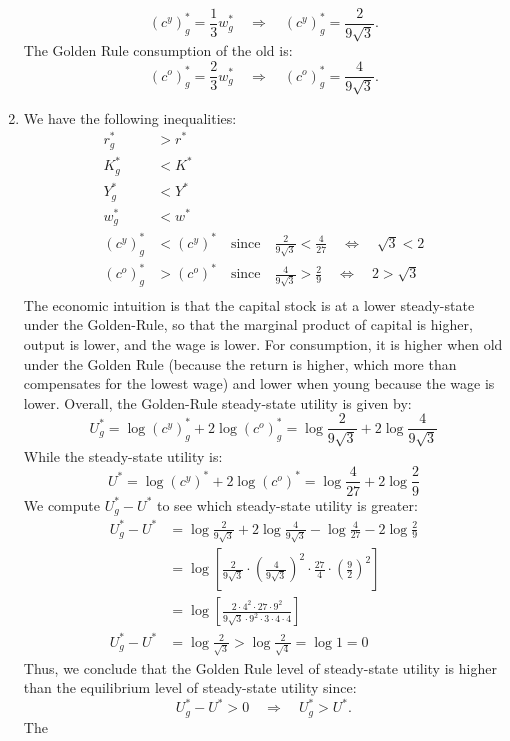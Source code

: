 \documentclass[]{book}
\begin{document}
\begin{enumerate}
  \[(c^y)^{*}_g = \frac{1}{3}w^{*}_g \quad \Rightarrow \quad \boxed{(c^y)^{*}_g = \frac{2}{9\sqrt{3}}}.\]
  The Golden Rule consumption of the old is:
  \[(c^o)^{*}_g = \frac{2}{3}w^{*}_g \quad \Rightarrow \quad \boxed{(c^o)^{*}_g = \frac{4}{9\sqrt{3}}}.\]
\item
  We have the following inequalities: \[
  \begin{aligned}
  r^{*}_g &> r^{*}\\
  K^{*}_g &< K^{*}\\
  Y^{*}_g &< Y^{*}\\
  w^{*}_g &< w^{*}\\
  (c^y)^{*}_g &< (c^y)^{*} \quad \text{since} \quad \frac{2}{9\sqrt{3}}<\frac{4}{27} \quad \Leftrightarrow \quad \sqrt{3} <2 \\
  (c^o)^{*}_g &> (c^o)^{*} \quad \text{since} \quad \frac{4}{9\sqrt{3}}>\frac{2}{9} \quad \Leftrightarrow \quad 2 >\sqrt{3} \\
  \end{aligned}
  \] The economic intuition is that the capital stock is at a lower
  steady-state under the Golden-Rule, so that the marginal product of
  capital is higher, output is lower, and the wage is lower. For
  consumption, it is higher when old under the Golden Rule (because the
  return is higher, which more than compensates for the lowest wage) and
  lower when young because the wage is lower. Overall, the Golden-Rule
  steady-state utility is given by:
  \[U^*_g = \log(c^y)^{*}_g+2\log(c^o)^{*}_g = \log\frac{2}{9\sqrt{3}}+2\log \frac{4}{9\sqrt{3}}\]
  While the steady-state utility is:
  \[U^* = \log(c^y)^{*}+2\log(c^o)^{*} = \log\frac{4}{27}+2\log \frac{2}{9}\]
  We compute \(U^{*}_g-U^{*}\) to see which steady-state utility is
  greater: \[
  \begin{aligned}
  U^{*}_g-U^{*} &= \log\frac{2}{9\sqrt{3}}+2\log \frac{4}{9\sqrt{3}} - \log\frac{4}{27}-2\log \frac{2}{9}\\
  &= \log \left[\frac{2}{9\sqrt{3}} \cdot \left(\frac{4}{9\sqrt{3}}\right)^2 \cdot\frac{27}{4} \cdot \left(\frac{9}{2}\right)^2\right]\\
  &=\log \left[\frac{2 \cdot 4^2 \cdot 27 \cdot 9^2}{9\sqrt{3} \cdot 9^2 \cdot 3\cdot 4 \cdot 4}\right]\\
  U^{*}_g-U^{*}&=\log \frac{2}{\sqrt3} > \log \frac{2}{\sqrt4}=\log1 =0
  \end{aligned}
  \] Thus, we conclude that the Golden Rule level of steady-state
  utility is higher than the equilibrium level of steady-state utility
  since:
  \[U^{*}_g-U^{*}>0\quad \Rightarrow \quad \boxed{U^{*}_g>U^{*}}.\] The

\end{enumerate}
\end{document}
